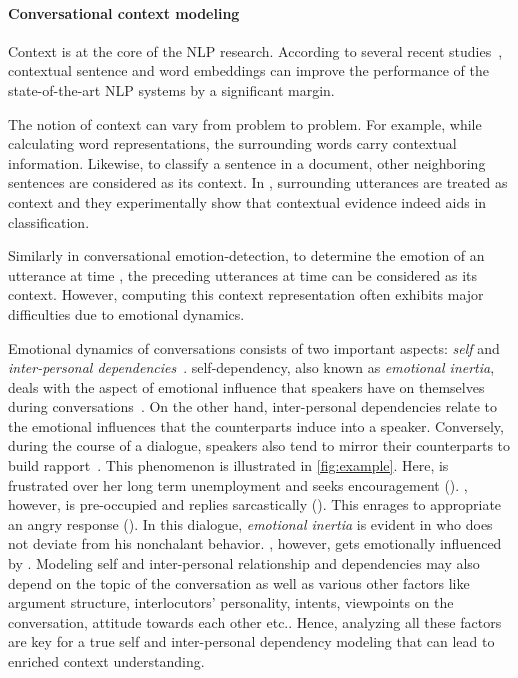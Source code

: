 \documentclass{IEEEtran}\usepackage[pdftex]{graphicx}
\begin{document}
	\paragraph{Conversational context modeling}
	
	Context is at the core of the NLP research. According to several recent studies~\citep{peters2018deep,devlin2018bert}, contextual sentence and word embeddings can improve the performance of the state-of-the-art NLP systems by a significant margin.
	
	The notion of context can vary from problem to problem. For example, while calculating word representations, the surrounding words carry contextual information. Likewise, to classify a sentence in a document, other neighboring sentences are considered as its context. In \citet{poria2017context}, surrounding utterances are treated as context and they experimentally show that contextual evidence indeed aids in classification.
	
	Similarly in conversational emotion-detection, to determine the emotion of an utterance at time , the preceding utterances at time  can be considered as its context. However, computing this context representation often exhibits major difficulties due to emotional dynamics.
	
	Emotional dynamics of conversations consists of two important aspects: \textit{self} and \textit{inter-personal dependencies}~\citep{morris2000emotions}. self-dependency, also known as \textit{emotional inertia}, deals with the aspect of emotional influence that speakers have on themselves during conversations~\citep{kuppens2010emotional}. 
	On the other hand, inter-personal dependencies relate to the emotional influences that the counterparts induce into a speaker. Conversely, during the course of a dialogue, speakers also tend to mirror their counterparts to build rapport~\citep{navarretta2016mirroring}. This phenomenon is illustrated in \cref{fig:example}. Here,  is frustrated over her long term unemployment and seeks encouragement (). , however, is pre-occupied and replies sarcastically (). This enrages  to appropriate an angry response (). In this dialogue, \textit{emotional inertia} is evident in  who does not deviate from his nonchalant behavior. , however, gets emotionally influenced by . Modeling self and inter-personal relationship and dependencies may also depend on the topic of the conversation as well as various other factors like argument structure, interlocutors’ personality, intents, viewpoints on the conversation, attitude towards each other etc.. Hence, analyzing all these factors are key for a true self and inter-personal dependency modeling that can lead to enriched context understanding. 
	
\end{document}
